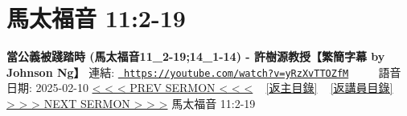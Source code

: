 \documentclass{book}
\begin{document}
\section{馬太福音 11:2-19}
\label{sec:yRzXvTTOZfM}
\textbf{當公義被踐踏時  (馬太福音11\_2-19;14\_1-14) - 許樹源教授【繁簡字幕 by Johnson Ng】}
\newline
\newline
連結: \href{https://youtube.com/watch?v=yRzXvTTOZfM}{\texttt{ https://youtube.com/watch?v=yRzXvTTOZfM}} ~~~~ 語音日期: 2025-02-10 
\newline
\newline
\hyperref[sec:w_ajWsBZ9eQ]{< < < PREV SERMON < < <}
~
\hyperlink{toc}{[返主目錄]}
~
\hyperref[ch:preacher7]{[返講員目錄]}
~
\hyperref[sec:srCkvhUNl9w]{> > > NEXT SERMON > > >}
\newline
\newline
馬太福音 11:2-19
\newline
\end{document}
